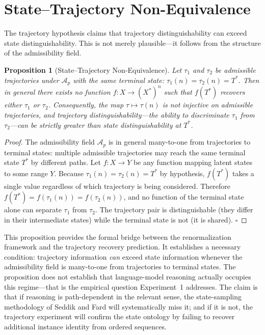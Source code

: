 \documentclass[11pt]{article}
\newtheorem{proposition}{Proposition}
\begin{document}
\section{State--Trajectory Non-Equivalence}

The trajectory hypothesis claims that trajectory distinguishability can exceed state
distinguishability. This is not merely plausible---it follows from the structure of the
admissibility field.

\begin{proposition}[State--Trajectory Non-Equivalence]
Let $\tau_1$ and $\tau_2$ be admissible trajectories under $\mathcal{A}_p$ with the same
terminal state: $\tau_1(n) = \tau_2(n) = T^*$. Then in general there exists no function
$f: X \to (X^*)^n$ such that $f(T^*)$ recovers either $\tau_1$ or $\tau_2$.
Consequently, the map $\tau \mapsto \tau(n)$ is not injective on admissible trajectories, and
trajectory distinguishability---the ability to discriminate $\tau_1$ from $\tau_2$---can be
strictly greater than state distinguishability at $T^*$.
\end{proposition}

\begin{proof}
The admissibility field $\mathcal{A}_p$ is in general many-to-one from trajectories to terminal
states: multiple admissible trajectories may reach the same terminal state $T^*$ by different
paths. Let $f: X \to Y$ be any function mapping latent states to some range $Y$. Because
$\tau_1(n) = \tau_2(n) = T^*$ by hypothesis, $f(T^*)$ takes a single value regardless of which
trajectory is being considered. Therefore $f(T^*) = f(\tau_1(n)) = f(\tau_2(n))$, and no
function of the terminal state alone can separate $\tau_1$ from $\tau_2$. The trajectory pair
is distinguishable (they differ in their intermediate states) while the terminal state is not
(it is shared). $\square$
\end{proof}

This proposition provides the formal bridge between the renormalization framework and the
trajectory recovery prediction. It establishes a necessary condition: trajectory information
\emph{can} exceed state information whenever the admissibility field is many-to-one from
trajectories to terminal states. The proposition does not establish that language-model reasoning
actually occupies this regime---that is the empirical question Experiment~1 addresses. The claim
is that if reasoning is path-dependent in the relevant sense, the state-sampling methodology of
Seddik and Fard will systematically miss it; and if it is not, the trajectory experiment will
confirm the state ontology by failing to recover additional instance identity from ordered
sequences.
\end{document}
